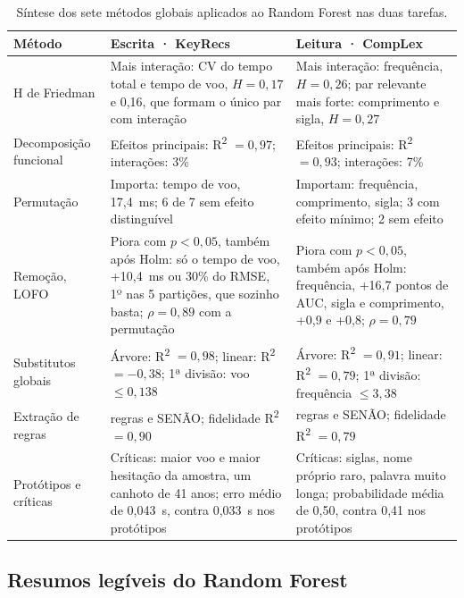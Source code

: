 \documentclass[conference]{IEEEtran}
\newcommand{\Rdois}{R\textsuperscript{2}}
\begin{document}
\begin{table}[!t]
\caption{Síntese dos sete métodos globais aplicados ao Random Forest nas duas tarefas.}
\label{tab:sintese}
\centering
\footnotesize
\setlength{\tabcolsep}{5pt}
\renewcommand{\arraystretch}{1.12}
\begin{tabular}{@{}>{\raggedright\arraybackslash}p{3.3cm}
                >{\raggedright\arraybackslash}p{6.4cm}
                >{\raggedright\arraybackslash}p{6.6cm}@{}}
\toprule
\textbf{Método} & \textbf{Escrita · KeyRecs} & \textbf{Leitura · CompLex} \\
\midrule
H de Friedman
  & Mais interação: CV do tempo total e tempo de voo, $H = 0,17$ e 0,16, que formam o único par com interação
  & Mais interação: frequência, $H = 0,26$; par relevante mais forte: comprimento e sigla, $H = 0,27$ \\
Decomposição funcional
  & Efeitos principais: \Rdois{} $= 0,97$; interações: 3\%
  & Efeitos principais: \Rdois{} $= 0,93$; interações: 7\% \\
Permutação
  & Importa: tempo de voo, 17,4~ms; 6 de 7 sem efeito distinguível
  & Importam: frequência, comprimento, sigla; 3 com efeito mínimo; 2 sem efeito \\
Remoção, LOFO
  & Piora com $p < 0,05$, também após Holm: só o tempo de voo, +10,4~ms ou 30\% do RMSE, 1º nas 5 partições, que sozinho basta; $\rho = 0,89$ com a permutação
  & Piora com $p < 0,05$, também após Holm: frequência, +16,7 pontos de AUC, sigla e comprimento, +0,9 e +0,8; $\rho = 0,79$ \\
Substitutos globais
  & Árvore: \Rdois{} $= 0,98$; linear: \Rdois{} $= -0,38$; 1ª divisão: voo $\leq 0,138$
  & Árvore: \Rdois{} $= 0,91$; linear: \Rdois{} $= 0,79$; 1ª divisão: frequência $\leq 3,38$ \\
Extração de regras
  & 5 regras e SENÃO; fidelidade \Rdois{} $= 0,90$
  & 5 regras e SENÃO; fidelidade \Rdois{} $= 0,79$ \\
Protótipos e críticas
  & Críticas: maior voo e maior hesitação da amostra, um canhoto de 41 anos; erro médio de 0,043~s, contra 0,033~s nos protótipos
  & Críticas: siglas, nome próprio raro, palavra muito longa; probabilidade média de 0,50, contra 0,41 nos protótipos \\
\bottomrule
\end{tabular}
\end{table}

\subsection{Resumos legíveis do Random Forest}
\end{document}
